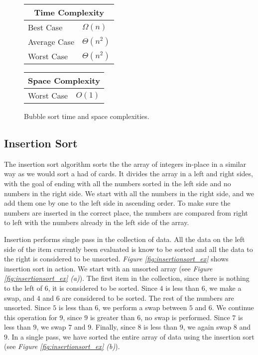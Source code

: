 \begin{figure}[!ht]
    \centering
    \begin{tabular}{l|l}
    \multicolumn{2}{c}{\textbf{Time Complexity}} \\
    \hline
    Best Case    & $\Omega(n)$ \\
    Average Case & $\Theta(n^2)$ \\
    Worst Case   & $\Theta(n^2)$ \\
    \end{tabular}
    \quad\quad
    \begin{tabular}{l|l}
    \multicolumn{2}{c}{\textbf{Space Complexity}} \\
    \hline
    Worst Case   & $O(1)$
    \end{tabular}
    
    \caption{Bubble sort time\cite{kazim2017} and space complexities\cite{big-o}.}
    \label{fig:bubblesort}
\end{figure}

\subsection{Insertion Sort}

The insertion sort algorithm sorts the the array of integers in-place in a similar way as we would sort a had of cards. It divides the array in a left and right sides, with the goal of ending with all the numbers sorted in the left side and no numbers in the right side. We start with all the numbers in the right side, and we add them one by one to the left side in ascending order. To make sure the numbers are inserted in the correct place, the numbers are compared from right to left with the numbers already in the left side of the array\cite{clrs2009}.

Insertion performs single pass in the collection of data. All the data on the left side of the item currently been evaluated is know to be sorted and all the data to the right is considered to be unsorted. \textit{Figure \ref{fig:insertionsort_ex}} shows insertion sort in action. We start with an unsorted array (see \textit{Figure \ref{fig:insertionsort_ex} (a)}). The first item in the collection, since there is nothing to the left of $6$, it is considered to be sorted. Since $4$ is less than $6$, we make a swap, and $4$ and $6$ are considered to be sorted. The rest of the numbers are unsorted. Since $5$ is less than $6$, we perform a swap between $5$ and $6$. We continue this operation for $9$, since $9$ is greater than $6$, no swap is performed. Since $7$ is less than $9$, we swap $7$ and $9$. Finally, since $8$ is less than $9$, we again swap $8$ and $9$. In a single pass, we have sorted the entire array of data using the insertion sort (see \textit{Figure \ref{fig:insertionsort_ex} (b)}).

